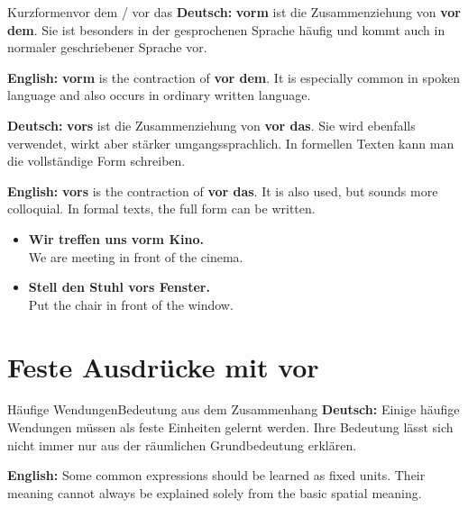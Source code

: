 \documentclass[a4paper,11pt]{article}
\newcommand{\GermanText}[1]{\textbf{Deutsch: }#1\par}
\newcommand{\EnglishText}[1]{{\small\color{SoftGray}\textbf{English: }#1\par}}
\newcommand{\ExampleItem}[2]{\item \textbf{#1}\\{\small\color{SoftGray}#2}}
\begin{document}
        \begin{grammarentry}{Kurzformen}{vor dem / vor das}
            \GermanText{\textbf{vorm} ist die Zusammenziehung von \textbf{vor dem}. Sie ist besonders in der gesprochenen Sprache häufig und kommt auch in normaler geschriebener Sprache vor.}
            \EnglishText{\textbf{vorm} is the contraction of \textbf{vor dem}. It is especially common in spoken language and also occurs in ordinary written language.}

            \GermanText{\textbf{vors} ist die Zusammenziehung von \textbf{vor das}. Sie wird ebenfalls verwendet, wirkt aber stärker umgangssprachlich. In formellen Texten kann man die vollständige Form schreiben.}
            \EnglishText{\textbf{vors} is the contraction of \textbf{vor das}. It is also used, but sounds more colloquial. In formal texts, the full form can be written.}
        \end{grammarentry}

        \begin{exbox}
            \begin{itemize}
                \ExampleItem{Wir treffen uns vorm Kino.}{We are meeting in front of the cinema.}
                \ExampleItem{Stell den Stuhl vors Fenster.}{Put the chair in front of the window.}
            \end{itemize}
        \end{exbox}


    \section{Feste Ausdrücke mit \glqq vor\grqq}

        \begin{grammarentry}{Häufige Wendungen}{Bedeutung aus dem Zusammenhang}
            \GermanText{Einige häufige Wendungen müssen als feste Einheiten gelernt werden. Ihre Bedeutung lässt sich nicht immer nur aus der räumlichen Grundbedeutung erklären.}
            \EnglishText{Some common expressions should be learned as fixed units. Their meaning cannot always be explained solely from the basic spatial meaning.}
        \end{grammarentry}
\end{document}
